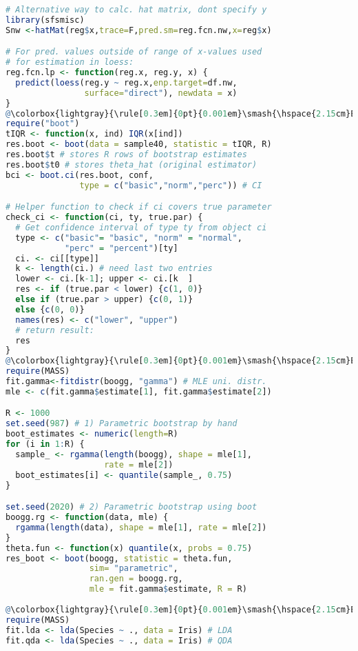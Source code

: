 \begin{lstlisting}[language=R]
# Alternative way to calc. hat matrix, dont specify y
library(sfsmisc)
Snw <-hatMat(reg$x,trace=F,pred.sm=reg.fcn.nw,x=reg$x) 

# For pred. values outside of range of x-values used 
# for estimation in loess:
reg.fcn.lp <- function(reg.x, reg.y, x) {
  predict(loess(reg.y ~ reg.x,enp.target=df.nw,
                surface="direct"), newdata = x)
}
@\colorbox{lightgray}{\rule[0.3em]{0pt}{0.001em}\smash{\hspace{2.15cm}Exercise 5\hspace{2.15cm}}}@
require("boot")
tIQR <- function(x, ind) IQR(x[ind])
res.boot <- boot(data = sample40, statistic = tIQR, R)
res.boot$t # stores R rows of bootstrap estimates
res.boot$t0 # stores theta_hat (original estimator)
bci <- boot.ci(res.boot, conf, 
               type = c("basic","norm","perc")) # CI

# Helper function to check if ci covers true parameter
check_ci <- function(ci, ty, true.par) {
  # Get confidence interval of type ty from object ci
  type <- c("basic"= "basic", "norm" = "normal", 
            "perc" = "percent")[ty]
  ci. <- ci[[type]]
  k <- length(ci.) # need last two entries
  lower <- ci.[k-1]; upper <- ci.[k  ]
  res <- if (true.par < lower) {c(1, 0)} 
  else if (true.par > upper) {c(0, 1)} 
  else {c(0, 0)}
  names(res) <- c("lower", "upper")
  # return result:
  res
}
@\colorbox{lightgray}{\rule[0.3em]{0pt}{0.001em}\smash{\hspace{2.15cm}Exercise 6\hspace{2.15cm}}}@
require(MASS)
fit.gamma<-fitdistr(boogg, "gamma") # MLE uni. distr.
mle <- c(fit.gamma$estimate[1], fit.gamma$estimate[2])

R <- 1000
set.seed(987) # 1) Parametric bootstrap by hand
boot_estimates <- numeric(length=R)
for (i in 1:R) { 
  sample_ <- rgamma(length(boogg), shape = mle[1], 
                    rate = mle[2])
  boot_estimates[i] <- quantile(sample_, 0.75)
}

set.seed(2020) # 2) Parametric bootstrap using boot
boogg.rg <- function(data, mle) {
  rgamma(length(data), shape = mle[1], rate = mle[2])
}
theta.fun <- function(x) quantile(x, probs = 0.75)
res_boot <- boot(boogg, statistic = theta.fun, 
                 sim= "parametric", 
                 ran.gen = boogg.rg, 
                 mle = fit.gamma$estimate, R = R)
                 
@\colorbox{lightgray}{\rule[0.3em]{0pt}{0.001em}\smash{\hspace{2.15cm}Exercise 7\hspace{2.15cm}}}@
require(MASS)
fit.lda <- lda(Species ~ ., data = Iris) # LDA
fit.qda <- lda(Species ~ ., data = Iris) # QDA


\end{lstlisting}
